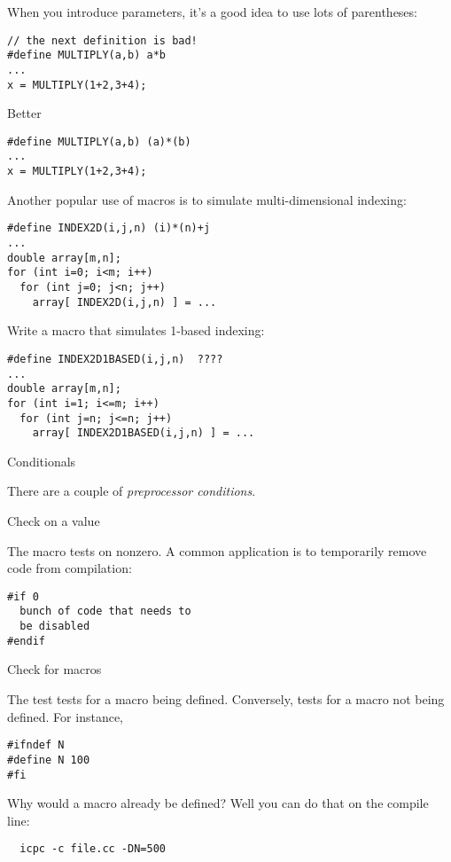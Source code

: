 When you introduce parameters, it's a good idea to use lots of parentheses:
\begin{lstlisting}
// the next definition is bad!
#define MULTIPLY(a,b) a*b
...
x = MULTIPLY(1+2,3+4);
\end{lstlisting}
Better
\begin{lstlisting}
#define MULTIPLY(a,b) (a)*(b)
...
x = MULTIPLY(1+2,3+4);
\end{lstlisting}

Another popular use of macros is to simulate multi-dimensional indexing:
\begin{lstlisting}
#define INDEX2D(i,j,n) (i)*(n)+j
...
double array[m,n];
for (int i=0; i<m; i++)
  for (int j=0; j<n; j++)
    array[ INDEX2D(i,j,n) ] = ...
\end{lstlisting}

\begin{exercise}
  Write a macro that simulates 1-based indexing:
\begin{lstlisting}
#define INDEX2D1BASED(i,j,n)  ????
...
double array[m,n];
for (int i=1; i<=m; i++)
  for (int j=n; j<=n; j++)
    array[ INDEX2D1BASED(i,j,n) ] = ...
\end{lstlisting}
\end{exercise}


 {Conditionals}


There are a couple of \emph{preprocessor conditions}.

 {Check on a value}

The  macro tests on nonzero. A common application is to
temporarily remove code from compilation:
\begin{lstlisting}
#if 0
  bunch of code that needs to
  be disabled
#endif
\end{lstlisting}

 {Check for macros}

The 
test tests for a macro being defined. Conversely,
tests for a macro not being defined. For instance,
\begin{lstlisting}
#ifndef N
#define N 100
#fi
\end{lstlisting}
Why would a macro already be defined? Well you can do that on the
compile line:
\begin{lstlisting}
  icpc -c file.cc -DN=500
\end{lstlisting}

